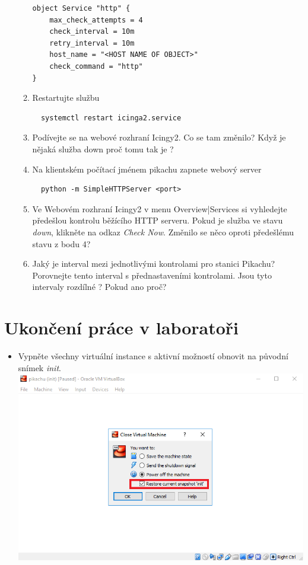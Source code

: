 \begin{itemize}
\begin{enumerate}
\begin{verbatim}
object Service "http" {
    max_check_attempts = 4
    check_interval = 10m
    retry_interval = 10m
    host_name = "<HOST NAME OF OBJECT>"
    check_command = "http"
}

\end{verbatim} 
            \item Restartujte službu
\begin{verbatim}
  systemctl restart icinga2.service
\end{verbatim} 
          \item Podívejte se na webové rozhraní Icingy2. Co se tam změnilo? 
          Když je nějaká služba down proč tomu tak je ?

          \item Na klientském počítací jménem pikachu zapnete webový server
\begin{verbatim}
  python -m SimpleHTTPServer <port>
\end{verbatim}
          \item Ve Webovém rozhraní Icingy2 v menu Overview|Services si
            vyhledejte předešlou kontrolu běžícího HTTP serveru. Pokud je služba
            ve stavu \emph{down}, klikněte na odkaz \textit{Check Now}. Změnilo se něco oproti předešlému stavu z bodu 4?

          \item Jaký je interval mezi jednotlivými kontrolami pro stanici
            Pikachu? Porovnejte tento interval s přednastaveními kontrolami.
            Jsou tyto intervaly rozdílné ? Pokud ano proč?

\end{enumerate}
\end{itemize}

\section*{Ukončení práce v laboratoři}
\begin{itemize}
  \item Vypněte všechny virtuální instance s aktivní možností obnovit na původní
    snímek \emph{init}.
          \includegraphics[width=\linewidth]{files/end.PNG}

\end{itemize}
